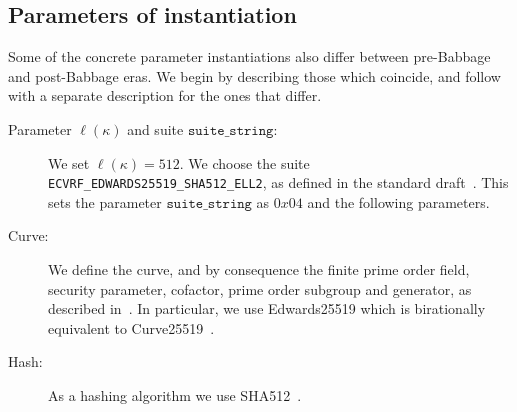 \subsection{Parameters of instantiation}
Some of the concrete parameter instantiations also differ between pre-Babbage and post-Babbage eras. We begin by describing those which coincide, and follow with a separate description for the ones that differ.
\begin{description}
\item[Parameter $\ell(\kappa)$ and suite $\texttt{suite\_string}$:] We set $\ell(\kappa)=512$. We choose the suite \texttt{ECVRF\_EDWARDS25519\_SHA512\_ELL2}, as defined in the standard draft~\cite{vrfdraft10}. This sets the parameter $\texttt{suite\_string}$ as $0x04$ and the following parameters.
\item[Curve:] We define the curve, and by consequence the finite prime order field, security parameter, cofactor, prime order subgroup and generator, as described in~\cite{CHES:BDLSY11}. In particular, we use Edwards25519 which is birationally equivalent to Curve25519~\cite{PKC:Bernstein06}.
\item[Hash:] As a hashing algorithm we use SHA512~\cite{FIPS1802}.
\end{description}

